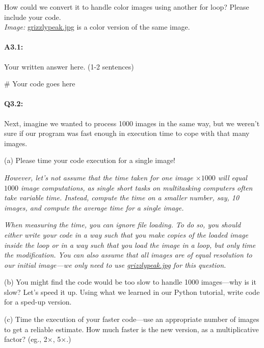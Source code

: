 \documentclass[11pt]{article}
\begin{document}
How could we convert it to handle color images using another for loop? Please include your code. \\

\emph{Image:} \href{grizzlypeak.jpg}{grizzlypeak.jpg} is a color version of the same image.

\paragraph{A3.1:} Your written answer here. (1-2 sentences)
\begin{python}
# Your code goes here
\end{python}



\pagebreak
\paragraph{Q3.2:} Next, imagine we wanted to process 1000 images in the same way, but we weren't sure if our program was fast enough in execution time to cope with that many images. 

(a) Please time your code execution for a single image!

\emph{However, let's not assume that the time taken for one image $\times1000$ will equal $1000$ image computations, as single short tasks on multitasking computers often take variable time. Instead, compute the time on a smaller number, say, 10 images, and compute the average time for a single image.}

\emph{When measuring the time, you can ignore file loading. To do so, you should either write your code in a way such that you make copies of the loaded image inside the loop or in a way such that you load the image in a loop, but only time the modification. You can also assume that all images are of equal resolution to our initial image---we only need to use \href{grizzlypeak.jpg}{grizzlypeak.jpg} for this question.}

(b) You might find the code would be too slow to handle 1000 images---why is it slow? Let's speed it up. Using what we learned in our Python tutorial, write code for a sped-up version.

(c) Time the execution of your faster code---use an appropriate number of images to get a reliable estimate. How much faster is the new version, as a multiplicative factor? (eg., 2$\times$, 5$\times$.)
\end{document}
